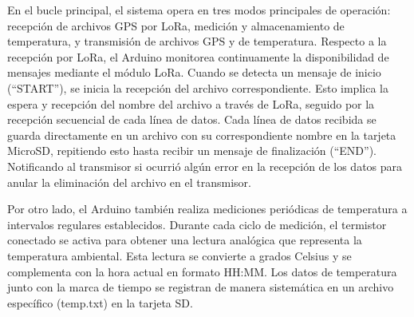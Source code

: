 \begin{itemize}
En el bucle principal, el sistema opera en tres modos principales de operación: recepción de archivos GPS por LoRa, medición y almacenamiento de temperatura, y transmisión de archivos GPS y de temperatura. Respecto a la recepción por LoRa, el Arduino monitorea continuamente la disponibilidad de mensajes mediante el módulo LoRa. Cuando se detecta un mensaje de inicio (``START''), se inicia la recepción del archivo correspondiente. Esto implica la espera y recepción del nombre del archivo a través de LoRa, seguido por la recepción secuencial de cada línea de datos. Cada línea de datos recibida se guarda directamente en un archivo con su correspondiente nombre en la tarjeta MicroSD, repitiendo esto hasta recibir un mensaje de finalización (``END''). Notificando al transmisor si ocurrió algún error en la recepción de los datos para anular la eliminación del archivo en el transmisor. 

Por otro lado, el Arduino también realiza mediciones periódicas de temperatura a intervalos regulares establecidos. Durante cada ciclo de medición, el termistor conectado se activa para obtener una lectura analógica que representa la temperatura ambiental. Esta lectura se convierte a grados Celsius y se complementa con la hora actual en formato HH:MM. Los datos de temperatura junto con la marca de tiempo se registran de manera sistemática en un archivo específico (temp.txt) en la tarjeta SD.


\end{itemize}
